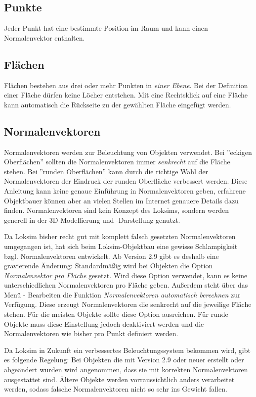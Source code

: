 \subsection{Punkte}
Jeder Punkt hat eine bestimmte Position im Raum und kann einen Normalenvektor enthalten.

\subsection{Flächen}
\label{sec:editor-obj-l3dobj-flaeche}
Flächen bestehen aus drei oder mehr Punkten in \emph{einer Ebene}. Bei der Definition einer Fläche dürfen keine Löcher entstehen. Mit eine Rechtsklick auf eine Fläche kann automatisch die Rückseite zu der gewählten Fläche eingefügt werden.

\subsection{Normalenvektoren}
\label{sec:editor-obj-l3dobj-normalen}
Normalenvektoren werden zur Beleuchtung von Objekten verwendet. Bei ''eckigen Oberflächen'' sollten die Normalenvektoren immer \emph{senkrecht} auf die Fläche stehen. Bei ''runden Oberflächen'' kann durch die richtige Wahl der Normalenvektoren der Eindruck der runden Oberfläche verbessert werden. Diese Anleitung kann keine genaue Einführung in Normalenvektoren geben, erfahrene Objektbauer können aber an vielen Stellen im Internet genauere Details dazu finden. Normalenvektoren sind kein Konzept des Loksims, sondern werden  generell in der 3D-Modellierung und -Darstellung genutzt.

Da Loksim bisher recht gut mit komplett falsch gesetzten Normalenvektoren umgegangen ist, hat sich beim Loksim-Objektbau eine gewisse Schlampigkeit bzgl. Normalenvektoren entwickelt. Ab Version 2.9 gibt es deshalb eine gravierende Änderung: Standardmäßig wird bei Objekten die Option \emph{Normalenvektor pro Fläche} gesetzt. Wird diese Option verwendet, kann es keine unterschiedlichen Normalenvektoren pro Fläche geben. Außerdem steht über das Menü - Bearbeiten die Funktion \emph{Normalenvektoren automatisch berechnen} zur Verfügung. Diese erzeugt Normalenvektoren die senkrecht auf die jeweilige Fläche stehen. Für die meisten Objekte sollte diese Option ausreichen. Für runde Objekte muss diese Einstellung jedoch deaktiviert werden und die Normalenvektoren wie bisher pro Punkt definiert werden.

Da Loksim in Zukunft ein verbessertes Beleuchtungssystem bekommen wird, gibt es folgende Regelung: Bei Objekten die mit Version 2.9 oder neuer erstellt oder abgeändert wurden wird angenommen, dass sie mit korrekten Normalenvektoren ausgestattet sind. Ältere Objekte werden vorraussichtlich anders verarbeitet werden, sodass falsche Normalenvektoren nicht so sehr ins Gewicht fallen.

